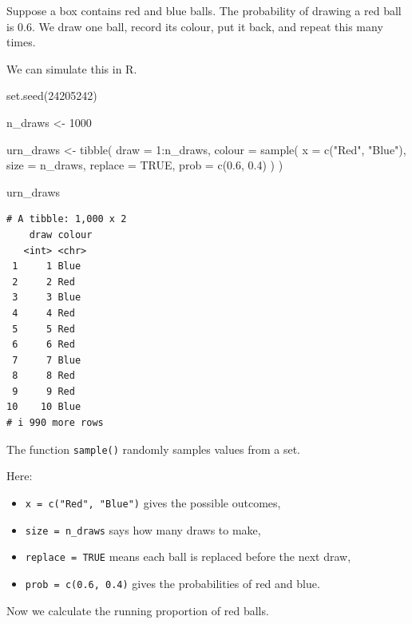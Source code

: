 \documentclass[
  letterpaper,
  DIV=11,
  numbers=noendperiod]{scrreprt}
\newenvironment{Shaded}{\begin{snugshade}}{\end{snugshade}}
\newcommand{\AttributeTok}[1]{\textcolor[rgb]{0.40,0.45,0.13}{#1}}
\newcommand{\ConstantTok}[1]{\textcolor[rgb]{0.56,0.35,0.01}{#1}}
\newcommand{\DecValTok}[1]{\textcolor[rgb]{0.68,0.00,0.00}{#1}}
\newcommand{\FloatTok}[1]{\textcolor[rgb]{0.68,0.00,0.00}{#1}}
\newcommand{\FunctionTok}[1]{\textcolor[rgb]{0.28,0.35,0.67}{#1}}
\newcommand{\NormalTok}[1]{\textcolor[rgb]{0.00,0.23,0.31}{#1}}
\newcommand{\OtherTok}[1]{\textcolor[rgb]{0.00,0.23,0.31}{#1}}
\newcommand{\SpecialCharTok}[1]{\textcolor[rgb]{0.37,0.37,0.37}{#1}}
\newcommand{\StringTok}[1]{\textcolor[rgb]{0.13,0.47,0.30}{#1}}
\providecommand{\tightlist}{%
  \setlength{\itemsep}{0pt}\setlength{\parskip}{0pt}}
\begin{document}
Suppose a box contains red and blue balls. The probability of drawing a
red ball is 0.6. We draw one ball, record its colour, put it back, and
repeat this many times.

We can simulate this in R.

\begin{Shaded}
\begin{Highlighting}[]
\FunctionTok{set.seed}\NormalTok{(}\DecValTok{24205242}\NormalTok{)}

\NormalTok{n\_draws }\OtherTok{\textless{}{-}} \DecValTok{1000}

\NormalTok{urn\_draws }\OtherTok{\textless{}{-}} \FunctionTok{tibble}\NormalTok{(}
  \AttributeTok{draw =} \DecValTok{1}\SpecialCharTok{:}\NormalTok{n\_draws,}
  \AttributeTok{colour =} \FunctionTok{sample}\NormalTok{(}
    \AttributeTok{x =} \FunctionTok{c}\NormalTok{(}\StringTok{"Red"}\NormalTok{, }\StringTok{"Blue"}\NormalTok{),}
    \AttributeTok{size =}\NormalTok{ n\_draws,}
    \AttributeTok{replace =} \ConstantTok{TRUE}\NormalTok{,}
    \AttributeTok{prob =} \FunctionTok{c}\NormalTok{(}\FloatTok{0.6}\NormalTok{, }\FloatTok{0.4}\NormalTok{)}
\NormalTok{  )}
\NormalTok{)}

\NormalTok{urn\_draws}
\end{Highlighting}
\end{Shaded}

\begin{verbatim}
# A tibble: 1,000 x 2
    draw colour
   <int> <chr> 
 1     1 Blue  
 2     2 Red   
 3     3 Blue  
 4     4 Red   
 5     5 Red   
 6     6 Red   
 7     7 Blue  
 8     8 Red   
 9     9 Red   
10    10 Blue  
# i 990 more rows
\end{verbatim}

The function \texttt{sample()} randomly samples values from a set.

Here:

\begin{itemize}
\tightlist
\item
  \texttt{x\ =\ c("Red",\ "Blue")} gives the possible outcomes,
\item
  \texttt{size\ =\ n\_draws} says how many draws to make,
\item
  \texttt{replace\ =\ TRUE} means each ball is replaced before the next
  draw,
\item
  \texttt{prob\ =\ c(0.6,\ 0.4)} gives the probabilities of red and
  blue.
\end{itemize}

Now we calculate the running proportion of red balls.
\end{document}

